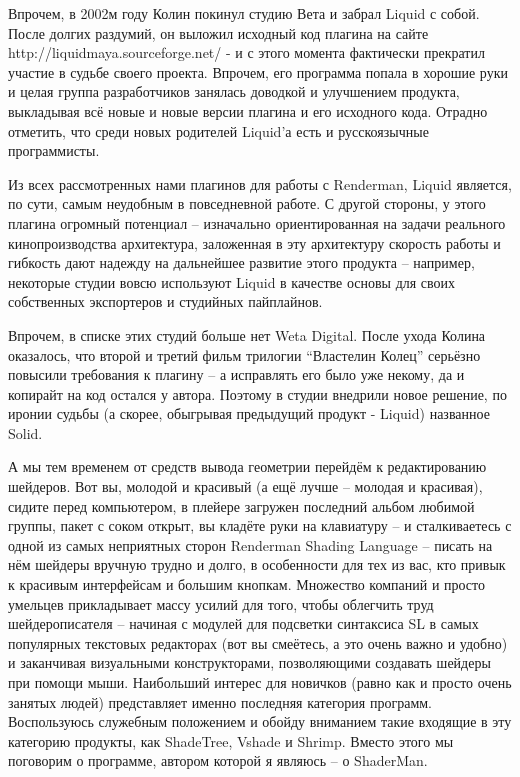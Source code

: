 Впрочем, в 2002м году Колин покинул студию Вета и
    забрал Liquid с собой. После долгих раздумий, он выложил исходный
    код плагина на сайте http://liquidmaya.sourceforge.net/ -
    и с этого момента фактически прекратил участие в судьбе своего
    проекта. Впрочем, его программа попала в хорошие руки и целая
    группа разработчиков занялась доводкой и улучшением продукта,
    выкладывая всё новые и новые версии плагина и его исходного кода.
    Отрадно отметить, что среди новых родителей Liquid’а есть и
    русскоязычные программисты.
  

 Из всех рассмотренных нами плагинов для работы с
    Renderman, Liquid является, по сути, самым неудобным в повседневной
    работе. С другой стороны, у этого плагина огромный потенциал –
    изначально ориентированная на задачи реального кинопроизводства
    архитектура, заложенная в эту архитектуру скорость работы и
    гибкость дают надежду на дальнейшее развитие этого продукта –
    например, некоторые студии вовсю используют Liquid в качестве
    основы для своих собственных экспортеров и студийных
    пайплайнов.
  

 Впрочем, в списке этих студий больше нет Weta
    Digital. После ухода Колина оказалось, что второй и третий фильм
    трилогии “Властелин Колец” серьёзно повысили требования к плагину –
    а исправлять его было уже некому, да и копирайт на код остался у
    автора. Поэтому в студии внедрили новое решение, по иронии судьбы
    (а скорее, обыгрывая предыдущий продукт - Liquid) названное
    Solid.
  

 А мы тем временем от средств вывода геометрии
    перейдём к редактированию шейдеров. Вот вы, молодой и красивый (а
    ещё лучше – молодая и красивая), сидите перед компьютером, в
    плейере загружен последний альбом любимой группы, пакет с соком
    открыт, вы кладёте руки на клавиатуру – и сталкиваетесь с одной из
    самых неприятных сторон Renderman Shading Language – писать на нём
    шейдеры вручную трудно и долго, в особенности для тех из вас, кто
    привык к красивым интерфейсам и большим кнопкам. Множество компаний
    и просто умельцев прикладывает массу усилий для того, чтобы
    облегчить труд шейдерописателя – начиная с модулей для подсветки
    синтаксиса SL в самых популярных текстовых редакторах (вот вы
    смеётесь, а это очень важно и удобно) и заканчивая визуальными
    конструкторами, позволяющими создавать шейдеры при помощи мыши.
    Наибольший интерес для новичков (равно как и просто очень занятых
    людей) представляет именно последняя категория программ.
    Воспользуюсь служебным положением  и обойду вниманием такие входящие
    в эту категорию продукты, как ShadeTree, Vshade и Shrimp. Вместо
    этого мы поговорим о программе, автором которой я являюсь – о
    ShaderMan.